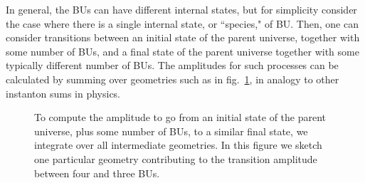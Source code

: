 \documentclass[12pt]{article}
\numberwithin{equation}{section}
\begin{document}
In general, the BUs can have different internal states, but for simplicity consider the case where there is a single internal state, or 
 ``species," of BU.  Then, one can consider transitions between an initial state of the parent universe, together with some number of BUs, and a final state of the parent universe together with some typically different number of BUs.  The amplitudes for such processes can be calculated by summing over geometries such as in fig.~\ref{fig:whamp}, in analogy to other instanton sums in physics.
\begin{figure}[h!]
\begin{center}
 \caption{\label{fig:whamp} To compute the amplitude to go from an initial state of the parent universe, plus some number of BUs, to a similar final state, we integrate over all intermediate geometries.  In this figure we sketch one particular geometry contributing to the transition amplitude between  four and three BUs.}
\end{center}
\end{figure}
\end{document}
